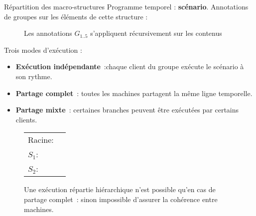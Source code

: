 \begin{block}{Répartition des macro-structures}
	Programme temporel : \textbf{scénario}. 
	Annotations de groupes sur les éléments de cette structure : 
    
    \begin{figure}
        \begin{tikzpicture}[scale=4]
        
        \end{tikzpicture}
        \caption{Les annotations $G_{1..5}$ s'appliquent récursivement sur les contenus}
    \end{figure}
	Trois modes d'exécution : 
	\begin{itemize}
		\item \textbf{Exécution indépendante}~:chaque client du groupe exécute le scénario à son rythme.
		\item \textbf{Partage complet}~: toutes les machines partagent la même ligne temporelle.
		\item \textbf{Partage mixte}~: certaines branches peuvent être exécutées par certains clients.
	\end{itemize}
    
    \begin{figure} \hspace*{-11cm}
        \begin{tabular}{L{3.5em}R{0.3\textwidth}}
            Racine: & \begin{tikzpicture}[scale=3.5]
            
            \end{tikzpicture} \\
            $S_1$: & \begin{tikzpicture}[scale=1.5, every node/.style={scale=0.8}]
            
            \end{tikzpicture} \\
            $S_2$: & \begin{tikzpicture}[scale=2.5, every node/.style={scale=0.8}]
            
            \end{tikzpicture} \\
        \end{tabular}
        \caption{
            Une exécution répartie hiérarchique n'est possible qu'en cas de partage complet~: sinon impossible d'assurer la cohérence entre machines.}
    \end{figure}
    
\end{block}
